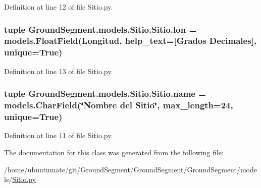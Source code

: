 Definition at line 12 of file Sitio.\+py.

\hypertarget{class_ground_segment_1_1models_1_1_sitio_1_1_sitio_a58939f0d8d5fff5d4807f745c6ba3335}{}
\subsubsection[{lon}]{\setlength{\rightskip}{0pt plus 5cm}tuple Ground\+Segment.\+models.\+Sitio.\+Sitio.\+lon = models.\+Float\+Field(\textquotesingle{}Longitud\textquotesingle{}, help\+\_\+text=\textquotesingle{}\mbox{[}Grados Decimales\mbox{]}\textquotesingle{}, unique=True)\hspace{0.3cm}{\ttfamily [static]}}\label{class_ground_segment_1_1models_1_1_sitio_1_1_sitio_a58939f0d8d5fff5d4807f745c6ba3335}


Definition at line 13 of file Sitio.\+py.

\hypertarget{class_ground_segment_1_1models_1_1_sitio_1_1_sitio_ad9bfe4bfea9a9a600a9cf0a17dfe2abf}{}
\subsubsection[{name}]{\setlength{\rightskip}{0pt plus 5cm}tuple Ground\+Segment.\+models.\+Sitio.\+Sitio.\+name = models.\+Char\+Field(\char`\"{}Nombre del {\bf Sitio}\char`\"{}, max\+\_\+length=24, unique=True)\hspace{0.3cm}{\ttfamily [static]}}\label{class_ground_segment_1_1models_1_1_sitio_1_1_sitio_ad9bfe4bfea9a9a600a9cf0a17dfe2abf}


Definition at line 11 of file Sitio.\+py.



The documentation for this class was generated from the following file\+:\begin{DoxyCompactItemize}
\item 
/home/ubuntumate/git/\+Ground\+Segment/\+Ground\+Segment/\+Ground\+Segment/models/\hyperlink{_sitio_8py}{Sitio.\+py}\end{DoxyCompactItemize}
